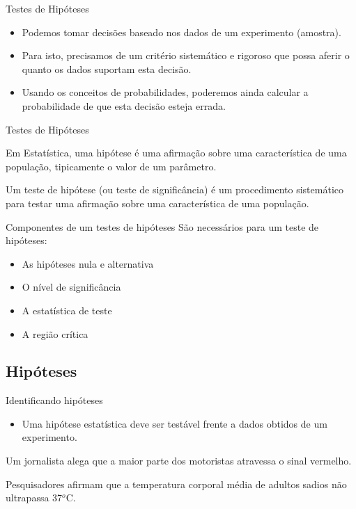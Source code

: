 \documentclass{beamer}
\begin{document}
\begin{frame}{Testes de Hipóteses}
  \begin{itemize}
  \item Podemos tomar decisões baseado nos dados de um experimento
    (amostra).
  \item Para isto, precisamos de um critério sistemático e rigoroso
    que possa aferir o quanto os dados suportam esta decisão.
  \item Usando os conceitos de probabilidades, poderemos ainda
    calcular a probabilidade de que esta decisão esteja errada.
  \end{itemize}
\end{frame}

\begin{frame}{Testes de Hipóteses}
  \begin{definition}
    Em Estatística, uma \alert{hipótese} é uma afirmação sobre uma
    característica de uma população, tipicamente o valor de um
    parâmetro.
  \end{definition}
  \begin{definition}
    Um \alert{teste de hipótese} (ou teste de significância) é um
    procedimento sistemático para testar uma afirmação sobre uma
    característica de uma população.
  \end{definition}
\end{frame}

\begin{frame}{Componentes de um testes de hipóteses}
  São necessários para um teste de hipóteses:
  \begin{itemize}
  \item As hipóteses nula e alternativa
  \item O nível de significância
  \item A estatística de teste
  \item A região crítica
  \end{itemize}
\end{frame}

\subsection{Hipóteses}

\begin{frame}{Identificando hipóteses}
  \begin{itemize}
  \item Uma hipótese estatística deve ser testável frente a dados
    obtidos de um experimento.
  \end{itemize}
  \begin{example}
    Um jornalista alega que a maior parte dos motoristas atravessa o
    sinal vermelho.
  \end{example}
  \begin{example}
    Pesquisadores afirmam que a temperatura corporal média de adultos
    sadios não ultrapassa 37$^o$C.
  \end{example}
\end{frame}
\end{document}
